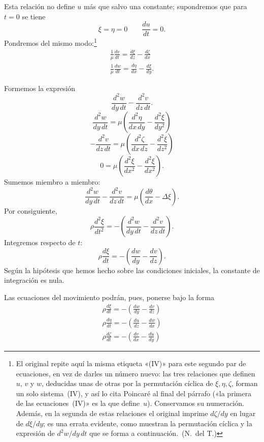Esta relación no define $u$ más que salvo una constante; supondremos que
para $t=0$ se tiene
\[
\xi=\eta=0\qquad \frac{du}{dt}=0.
\]
Pondremos del mismo modo:\footnote{El original repite aquí la misma
etiqueta «(IV)» para este segundo par de ecuaciones, en vez de darles un
número nuevo: las tres relaciones que definen $u$, $v$ y $w$, deducidas
unas de otras por la permutación cíclica de $\xi,\eta,\zeta$, forman un
solo sistema~(IV), y así lo cita Poincaré al final del párrafo («la
primera de las ecuaciones~(IV)» es la que define~$u$). Conservamos su
numeración. Además, en la segunda de estas relaciones el original imprime
$d\zeta/dy$ en lugar de $d\xi/dy$; es una errata
evidente, como muestran la permutación cíclica y la expresión de
$d^2w/dy\,dt$ que se forma a continuación.~(N.~del T.)}
\begin{equation}
\begin{gathered}
\frac{1}{\mu}\frac{dv}{dt}=\frac{d\xi}{dz}-\frac{d\zeta}{dx}\\[3pt]
\frac{1}{\mu}\frac{dw}{dt}=\frac{d\eta}{dx}-\frac{d\xi}{dy}.
\end{gathered}
\tag{IV}
\end{equation}

Formemos la expresión
\[
\frac{d^2w}{dy\,dt}-\frac{d^2v}{dz\,dt}.
\]
\[
\frac{d^2w}{dy\,dt}=\mu\left(\frac{d^2\eta}{dx\,dy}-\frac{d^2\xi}{dy^2}\right)
\]
\[
-\frac{d^2v}{dz\,dt}=\mu\left(\frac{d^2\zeta}{dx\,dz}-\frac{d^2\xi}{dz^2}\right)
\]
\[
0=\mu\left(\frac{d^2\xi}{dx^2}-\frac{d^2\xi}{dx^2}\right).
\]
Sumemos miembro a miembro:
\[
\frac{d^2w}{dy\,dt}-\frac{d^2v}{dz\,dt}=\mu\left(\frac{d\theta}{dx}-\Delta\xi\right).
\]
Por consiguiente,
\[
\rho\frac{d^2\xi}{dt^2}=-\left(\frac{d^2w}{dy\,dt}-\frac{d^2v}{dz\,dt}\right).
\]
Integremos respecto de $t$:
\[
\rho\frac{d\xi}{dt}=-\left(\frac{dw}{dy}-\frac{dv}{dz}\right).
\]
Según la hipótesis que hemos hecho sobre las condiciones iniciales, la
constante de integración es nula.

Las ecuaciones del movimiento podrán, pues, ponerse bajo la forma
\begin{equation}
\begin{gathered}
\rho\frac{d\xi}{dt}=-\left(\frac{dw}{dy}-\frac{dv}{dz}\right)\\[3pt]
\rho\frac{d\eta}{dt}=-\left(\frac{du}{dz}-\frac{dw}{dx}\right)\\[3pt]
\rho\frac{d\zeta}{dt}=-\left(\frac{dv}{dx}-\frac{du}{dy}\right)
\end{gathered}
\tag{V}
\end{equation}

